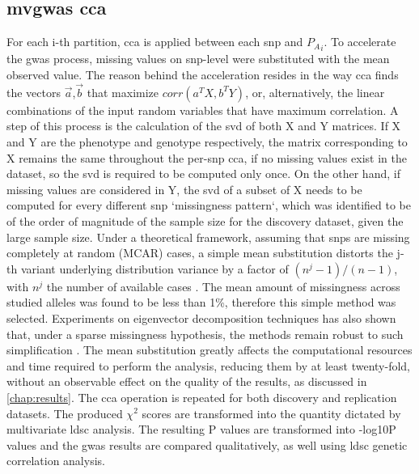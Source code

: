 \subsection{\acs{mvgwas} \acs{cca}}
For each i-th partition, \ac{cca} is applied between each \ac{snp} and ${P_A}_i$. To accelerate the \ac{gwas} process, missing values on snp-level were substituted with the mean observed value. The reason behind the acceleration resides in the way \ac{cca} finds the vectors $\vec{a}$,$\vec{b}$  that maximize $corr(a^TX,b^TY)$, or, alternatively, the linear combinations of the input random variables that have maximum correlation. A step of this process is the calculation of the \ac{svd} of both X and Y matrices. If X and Y are the phenotype and genotype respectively, the matrix corresponding to X remains the same throughout the per-\ac{snp} \ac{cca}, if no missing values exist in the dataset, so the \ac{svd} is required to be computed only once. On the other hand, if missing values are considered in Y, the \ac{svd} of a subset of X needs to be computed for every different \ac{snp} `missingness pattern`, which was identified to be of the order of magnitude of the sample size for the discovery dataset, given the large sample size.  Under a theoretical framework, assuming that \acp{snp} are missing completely at random (MCAR) cases, a simple mean substitution distorts the  j-th variant underlying distribution variance by a factor of $(n^j-1)/(n-1)$, with $n^j$ the number of available cases \cite{Little2002}. The mean amount of missingness across studied alleles was found to be less than 1\%, therefore this simple method was selected. Experiments on eigenvector decomposition techniques has also shown that, under a sparse missingness hypothesis, the methods remain robust to such simplification \cite{Sun2009,Dray2015}.  The mean substitution greatly affects the computational resources and time required to perform the analysis, reducing them by at least twenty-fold, without an observable effect on the quality of the results, as discussed in \autoref{chap:results}.
The \ac{cca} operation is repeated for both discovery and replication datasets. The produced $\chi^2$ scores are transformed into the quantity dictated by multivariate \ac{ldsc} analysis. The resulting P values are transformed into -log10P values and the \ac{gwas} results are compared qualitatively, as well using \ac{ldsc} genetic correlation analysis.


